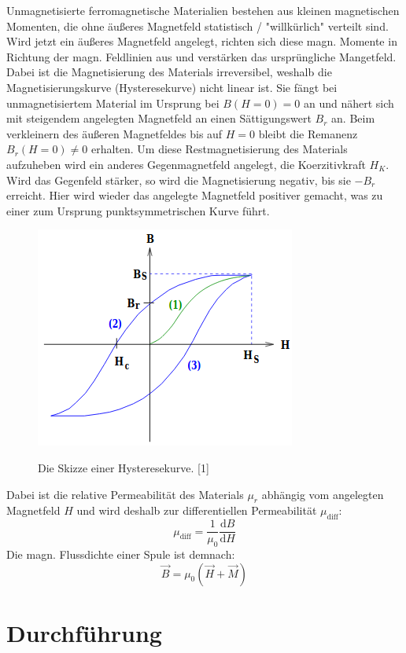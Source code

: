 \documentclass[titlepage = firstcover]{scrartcl}
\begin{document}
      Unmagnetisierte ferromagnetische Materialien bestehen aus kleinen magnetischen Momenten, die ohne äußeres Magnetfeld statistisch / "willkürlich" verteilt sind.
      Wird jetzt ein äußeres Magnetfeld angelegt, richten sich diese magn. Momente in Richtung der magn. Feldlinien aus und verstärken das ursprüngliche Mangetfeld.
      Dabei ist die Magnetisierung des Materials irreversibel, weshalb die Magnetisierungskurve (Hysteresekurve) nicht linear ist. Sie fängt bei
      unmagnetisiertem Material im Ursprung bei $B(H=0) = 0$ an und nähert sich mit steigendem angelegten Magnetfeld an einen Sättigungswert $B_r$ an.
      Beim verkleinern des äußeren Magnetfeldes bis auf $H = 0$ bleibt die Remanenz $B_r(H=0) \neq 0$ erhalten. Um diese Restmagnetisierung des Materials
      aufzuheben wird ein anderes Gegenmagnetfeld angelegt, die Koerzitivkraft $H_K$. Wird das Gegenfeld stärker, so wird die Magnetisierung negativ, bis
      sie $-B_r$ erreicht. Hier wird wieder das angelegte Magnetfeld positiver gemacht, was zu einer zum Ursprung punktsymmetrischen Kurve führt.
      \begin{figure}[h]
        \centering
        \caption{Die Skizze einer Hysteresekurve. [1]}
        \includegraphics[width = 0.4\linewidth]{Hysteresekurve.png}
        \label{fig:hysterese}
      \end{figure}
      Dabei ist die relative Permeabilität des Materials $\mu_r$ abhängig vom angelegten Magnetfeld $H$ und wird deshalb zur differentiellen Permeabilität $\mu_{\text{diff}}$:
      \begin{equation}
        \mu_{\text{diff}} = \frac{1}{\mu_\text{0}} \frac{\text{d}B}{\text{d}H}
      \end{equation}
      Die magn. Flussdichte einer Spule ist demnach:
      \begin{equation}
        \vec{B} = \mu_0 (\vec{H} + \vec{M})
      \end{equation}

    \section{Durchführung}
\end{document}
